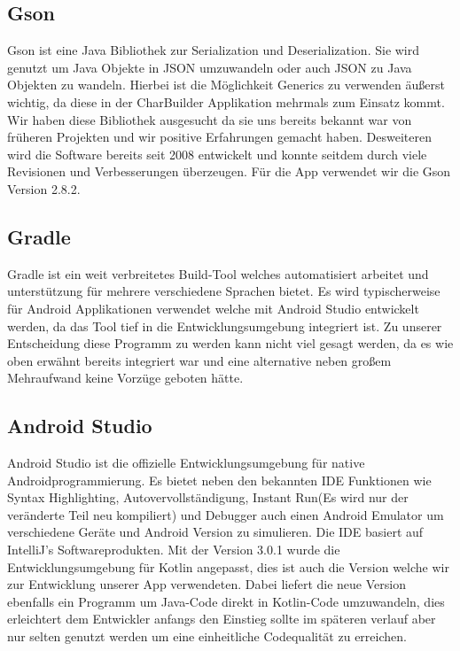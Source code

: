 \subsection{Gson}

Gson ist eine Java Bibliothek zur Serialization und Deserialization. Sie wird genutzt um Java Objekte in JSON umzuwandeln oder auch JSON zu Java Objekten zu wandeln. Hierbei ist die Möglichkeit Generics zu verwenden äußerst wichtig, da diese in der CharBuilder Applikation mehrmals zum Einsatz kommt. Wir haben diese Bibliothek ausgesucht da sie uns bereits bekannt war von früheren Projekten und wir positive Erfahrungen gemacht haben. Desweiteren wird die Software bereits seit 2008 entwickelt und konnte seitdem durch viele Revisionen und Verbesserungen überzeugen. Für die App verwendet wir die Gson Version 2.8.2.

\subsection{Gradle}

Gradle ist ein weit verbreitetes Build-Tool welches automatisiert arbeitet und unterstützung für mehrere verschiedene Sprachen bietet. Es wird typischerweise für Android Applikationen verwendet welche mit Android Studio entwickelt werden, da das Tool tief in die Entwicklungsumgebung integriert ist. Zu unserer Entscheidung diese Programm zu werden kann nicht viel gesagt werden, da es wie oben erwähnt bereits integriert war und eine alternative neben großem Mehraufwand keine Vorzüge geboten hätte.

\subsection{Android Studio}

Android Studio ist die offizielle Entwicklungsumgebung für native Androidprogrammierung. Es bietet neben den bekannten IDE Funktionen wie Syntax Highlighting, Autovervollständigung, Instant Run(Es wird nur der veränderte Teil neu kompiliert) und Debugger auch einen Android Emulator um verschiedene Geräte und Android Version zu simulieren. Die IDE basiert auf IntelliJ's Softwareprodukten. Mit der Version 3.0.1 wurde die Entwicklungsumgebung für Kotlin angepasst, dies ist auch die Version welche wir zur Entwicklung unserer App verwendeten. Dabei liefert die neue Version ebenfalls ein Programm um Java-Code direkt in Kotlin-Code umzuwandeln, dies erleichtert dem Entwickler anfangs den Einstieg sollte im späteren verlauf aber nur selten genutzt werden um eine einheitliche Codequalität zu erreichen.

